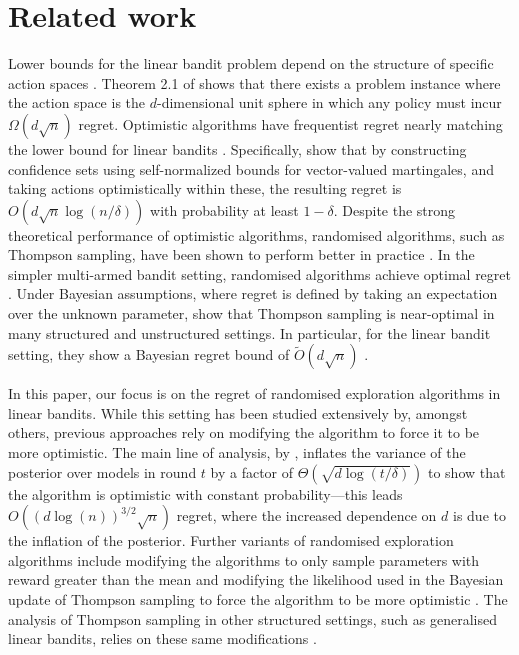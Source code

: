 \section{Related work}
Lower bounds for the linear bandit problem depend on the structure of specific action spaces \citep[for example,][]{dani2008stochastic,rusmevichientong2010linearly,lattimore2017end}. 
Theorem 2.1 of \citet{rusmevichientong2010linearly} shows that there exists a problem instance where the action space is the $d$-dimensional unit sphere in which any policy must incur $\Omega(d\sqrt{n})$ regret. Optimistic algorithms have frequentist regret nearly matching the lower bound for linear bandits \citep{auer2002using,dani2008stochastic,abbasi2011improved}.
Specifically, \citet{abbasi2011improved} show that by constructing confidence sets using self-normalized bounds for vector-valued martingales, and taking actions optimistically within these, the resulting regret is $O(d \sqrt{n} \log(n/\delta))$ with probability at least $1-\delta$. Despite the strong theoretical performance of optimistic algorithms, randomised algorithms, such as Thompson sampling, have been shown to perform better in practice \citep{chapelle2011empirical,may2012optimistic}. In the simpler multi-armed bandit setting, randomised algorithms achieve optimal regret 
\citep{agrawal2012analysis,kaufmann2012thompson,korda2013thompson,honda2014optimality}. 
Under Bayesian assumptions, where regret is defined by taking an expectation over the unknown parameter, \citet{russo2014learning,russo2016information} show that Thompson sampling is near-optimal in many structured and unstructured settings. In particular, for the linear bandit setting, they show a Bayesian regret bound of $\widetilde O(d\sqrt{n})$ \citep{russo2014learning}.

In this paper, our focus is on the regret of randomised exploration algorithms in linear bandits. While this setting has been studied extensively by, amongst others, previous approaches rely on modifying the algorithm to force it to be more optimistic. The main line of analysis, by \citet{agrawal2013thompson,abeille2017linear,xu2023noise}, inflates the variance of the posterior over models in round $t$ by a factor of $\Theta(\sqrt{d \log(t/\delta)})$ to show that the algorithm is optimistic with constant probability---this leads $O((d\log(n))^{3/2}\sqrt{n})$ regret, where the increased dependence on $d$ is due to the inflation of the posterior. Further variants of randomised exploration algorithms include modifying the algorithms to only sample parameters with reward greater than the mean \citep{may2012optimistic,vaswani2020old} and modifying the likelihood used in the Bayesian update of Thompson sampling to force the algorithm to be more optimistic \citep{zhang2021feel,huix2023tight}. The analysis of Thompson sampling in other structured settings, such as generalised linear bandits, relies on these same modifications \citet{kveton2020randomized,janz2023exploration}.

